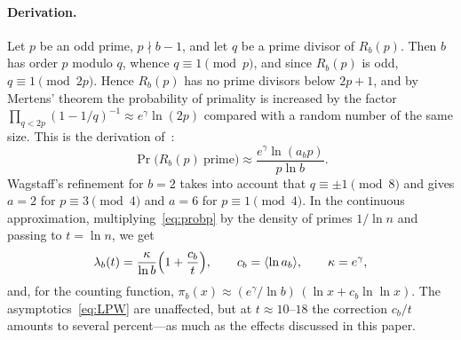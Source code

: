 \documentclass[11pt,a4paper]{article}
\theoremstyle{plain}
\theoremstyle{remark}
\newcommand{\Rb}{R_b}
\newcommand{\eg}{e^{\gamma}}
\begin{document}
\paragraph{Derivation.} Let $p$ be an odd prime, $p\nmid b-1$, and let $q$ be a prime
divisor of $\Rb(p)$. Then $b$ has order $p$ modulo $q$, whence $q\equiv1\pmod p$,
and since $\Rb(p)$ is odd, $q\equiv1\pmod{2p}$. Hence $\Rb(p)$ has no prime
divisors below $2p+1$, and by Mertens' theorem the probability of primality is
increased by the factor $\prod_{q<2p}(1-1/q)^{-1}\approx\eg\ln(2p)$ compared with
a random number of the same size. This is the derivation
of~\cite{wagstaff1983,t5k}:
\begin{equation}\label{eq:probp}
\Pr\bigl(\Rb(p)\ \text{prime}\bigr)\approx\frac{\eg\ln(a_bp)}{p\ln b}.
\end{equation}
Wagstaff's refinement for $b=2$ takes into account that $q\equiv\pm1\pmod8$ and
gives $a=2$ for $p\equiv3\pmod4$ and $a=6$ for $p\equiv1\pmod4$. In the
continuous approximation, multiplying~\eqref{eq:probp} by the density of primes
$1/\ln n$ and passing to
$t=\ln n$, we get
\begin{equation}\label{eq:lam2}
\lambda_b(t)=\frac{\kappa}{\ln b}\Bigl(1+\frac{c_b}{t}\Bigr),\qquad
c_b=\langle\ln a_b\rangle,\qquad \kappa=\eg,
\end{equation}
and, for the counting function,
$\pi_b(x)\approx(\eg/\ln b)\,(\ln x+c_b\ln\ln x)$. The
asymptotics~\eqref{eq:LPW} are unaffected, but at $t\approx10$--$18$ the
correction $c_b/t$ amounts to several percent---as much as the effects
discussed in this paper.
\end{document}
